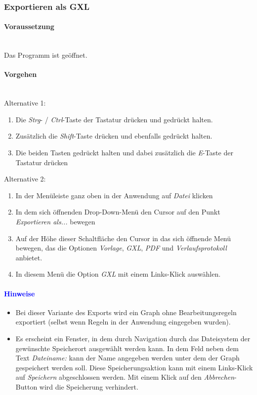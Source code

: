 \documentclass[enabledeprecatedfontcommands,fontsize=11pt,paper=a4,twoside]{scrartcl}
\newcounter{one}
\newcommand*{\hint}{\paragraph{\textcolor{blue}{Hinweise}}}
\newcommand*{\condition}{\paragraph{Voraussetzung}$\;$ \vspace{0.2cm}\\}
\newcommand*{\actions}{\paragraph{Vorgehen} $\;$\vspace{0.2cm}\\}
\begin{document}
		\subsubsection{Exportieren als GXL}
		\condition 	
		Das Programm ist geöffnet.
		\actions
		Alternative 1:
		\begin{enumerate}
				\item Die \textit{Strg}- / \textit{Ctrl}-Taste der Tastatur drücken und gedrückt halten.
				\item Zusätzlich die \textit{Shift}-Taste drücken und ebenfalls gedrückt halten.
				\item Die beiden Tasten gedrückt halten und dabei zusätzlich die \textit{E}-Taste der Tastatur drücken
		\end{enumerate}				
		Alternative 2:
		\begin{enumerate}
				\item In der Menüleiste ganz oben in der Anwendung auf \textit{Datei} klicken 
				\item In dem sich öffnenden Drop-Down-Menü den Cursor auf den Punkt \textit{Exportieren als...} bewegen
				\item Auf der Höhe dieser Schaltfläche den Cursor in das sich öffnende Menü bewegen, das die Optionen \textit{Vorlage}, \textit{GXL}, \textit{PDF} und \textit{Verlaufsprotokoll} anbietet.
				\item In diesem Menü die Option \textit{GXL} mit einem Links-Klick auswählen.
		\end{enumerate}		
		\hint
		\begin{itemize}
				\item Bei dieser Variante des Exports wird ein Graph ohne Bearbeitungsregeln exportiert (selbst wenn Regeln in der Anwendung eingegeben wurden).
				\item Es erscheint ein Fenster, in dem durch Navigation durch das Dateisystem der gewünschte Speicherort ausgewählt werden kann. In dem Feld neben dem Text \textit{Dateiname:} kann der Name angegeben werden unter dem der Graph gespeichert werden soll. Diese Speicherungsaktion kann mit einem Links-Klick auf \textit{Speichern} abgeschlossen werden. Mit einem Klick auf den \textit{Abbrechen}-Button wird die Speicherung verhindert.
		\end{itemize}
		
							\newpage
\end{document}
